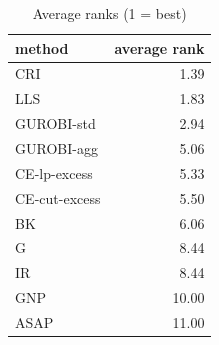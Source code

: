 \begin{table}[htbp]
\centering
\small
\caption{Average ranks (1 = best)}
\label{tab:E6_scalability_b120_ranks}
\begin{tabular}{lr}
\toprule
method & average rank \\
\midrule
CRI & 1.39 \\
LLS & 1.83 \\
GUROBI-std & 2.94 \\
GUROBI-agg & 5.06 \\
CE-lp-excess & 5.33 \\
CE-cut-excess & 5.50 \\
BK & 6.06 \\
G & 8.44 \\
IR & 8.44 \\
GNP & 10.00 \\
ASAP & 11.00 \\
\bottomrule
\end{tabular}
\end{table}
